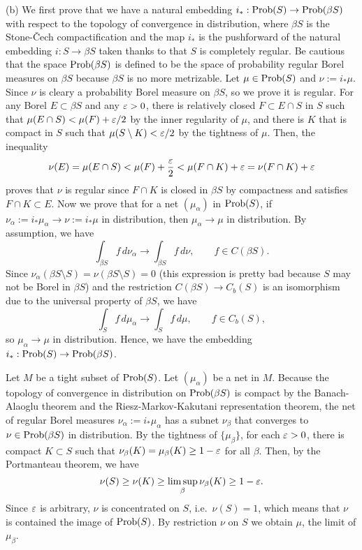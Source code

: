 \documentclass{../../large}
\begin{document}
\begin{pf}
(b)
We first prove that we have a natural embedding $i_*:\operatorname{Prob}(S)\to\operatorname{Prob}(\beta S)$ with respect to the topology of convergence in distribution, where $\beta S$ is the Stone-\v Cech compactification and the map $i_*$ is the pushforward of the natural embedding $i:S\to\beta S$ taken thanks to that $S$ is completely regular.
Be cautious that the space $\operatorname{Prob}(\beta S)$ is defined to be the space of probability regular Borel measures on $\beta S$ because $\beta S$ is no more metrizable.
Let $\mu\in\operatorname{Prob}(S)$ and $\nu:=i_*\mu$.
Since $\nu$ is cleary a probability Borel measure on $\beta S$, so we prove it is regular.
For any Borel $E\subset\beta S$ and any $\varepsilon>0$, there is relatively closed $F\subset E\cap S$ in $S$ such that $\mu(E\cap S)<\mu(F)+\varepsilon/2$ by the inner regularity of $\mu$, and there is $K$ that is compact in $S$ such that $\mu(S\setminus K)<\varepsilon/2$ by the tightness of $\mu$.
Then, the inequality
\[\nu(E)=\mu(E\cap S)<\mu(F)+\frac{\varepsilon}2<\mu(F\cap K)+\varepsilon=\nu(F\cap K)+\varepsilon\]
proves that $\nu$ is regular since $F\cap K$ is closed in $\beta S$ by compactness and satisfies $F\cap K\subset E$.
Now we prove that for a net $(\mu_\alpha)$ in $\operatorname{Prob}(S)$, if $\nu_\alpha:=i_*\mu_\alpha\to\nu:=i_*\mu$ in distribution, then $\mu_\alpha\to\mu$ in distribution.
By assumption, we have
\[\int_{\beta S}f\,d\nu_\alpha\to\int_{\beta S}f\,d\nu,\qquad f\in C(\beta S).\]
Since $\nu_\alpha(\beta S\setminus S)=\nu(\beta S\setminus S)=0$ (this expression is pretty bad because $S$ may not be Borel in $\beta S$) and the restriction $C(\beta S)\to C_b(S)$ is an isomorphism due to the universal property of $\beta S$, we have
\[\int_Sf\,d\mu_\alpha\to\int_Sf\,d\mu,\qquad f\in C_b(S),\] so $\mu_\alpha\to\mu$ in distribution.
Hence, we have the embedding $i_*:\operatorname{Prob}(S)\to\operatorname{Prob}(\beta S)$.

Let $M$ be a tight subset of $\operatorname{Prob}(S)$.
Let $(\mu_\alpha)$ be a net in $M$.
Because the topology of convergence in distribution on $\operatorname{Prob}(\beta S)$ is compact by the Banach-Alaoglu theorem and the Riesz-Markov-Kakutani representation theorem, the net of regular Borel measures $\nu_\alpha:=i_*\mu_\alpha$ has a subnet $\nu_\beta$ that converges to $\nu\in\operatorname{Prob}(\beta S)$ in distribution.
By the tightness of $\{\mu_\beta\}$, for each $\varepsilon>0$, there is compact $K\subset S$ such that $\nu_\beta(K)=\mu_\beta(K)\ge1-\varepsilon$ for all $\beta$.
Then, by the Portmanteau theorem, we have
\[\nu(S)\ge\nu(K)\ge\limsup_\beta\nu_\beta(K)\ge1-\varepsilon.\]
Since $\varepsilon$ is arbitrary, $\nu$ is concentrated on $S$, i.e.~$\nu(S)=1$, which means that $\nu$ is contained the image of $\operatorname{Prob}(S)$.
By restriction $\nu$ on $S$ we obtain $\mu$, the limit of $\mu_\beta$.
\end{pf}
\end{document}
